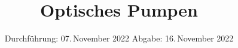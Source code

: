 

\subject{V21}
\title{Optisches Pumpen}
\date{%
  Durchführung: 07.\,November 2022
  \hspace{2em}
  Abgabe: 16.\,November 2022
}



\maketitle
\thispagestyle{empty}
\tableofcontents
\newpage







\newpage
\printbibliography{}


